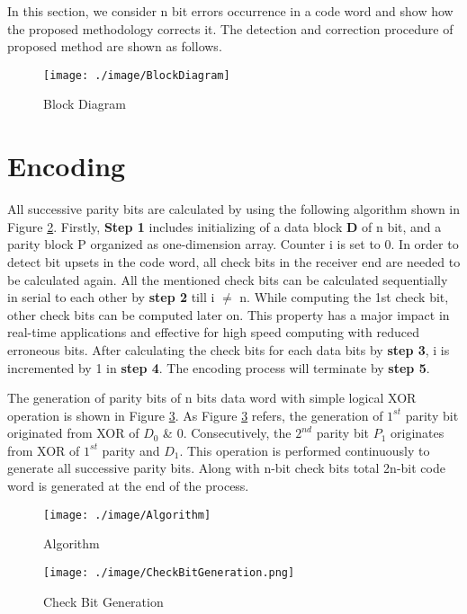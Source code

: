 \documentclass[12pt,a4paper]{report}
\begin{document}
In this section, we consider n bit errors occurrence in a code word and show how the proposed methodology corrects it. The detection and correction procedure of proposed method are shown as follows.\\
 
 \begin{figure}
  \texttt{[image: ./image/BlockDiagram]}
  \caption{Block Diagram}
  \label{fig:MethodologyOverview}
 \end{figure}
 
 \section{Encoding}
All successive
parity bits are calculated by using the following algorithm shown in Figure \ref{fig:Algorithm}. Firstly, \textbf{Step 1} includes initializing of a data block \textbf{D} of n bit, and a parity block P organized as one-dimension array. Counter i is set to 0. In order to detect bit upsets in the code word, all check bits in the receiver end are needed to be calculated again. All the mentioned check bits can be calculated sequentially in serial to each other by \textbf{step 2} till i $\neq$ n. While computing the 1st check bit, other check bits can be computed later on. This property has a major impact in real-time applications and effective for high speed computing with reduced erroneous bits. After calculating the check bits for each data bits by \textbf{step 3}, i is incremented by 1 in \textbf{step 4}. The encoding process will terminate by \textbf{step 5}. 

The generation of parity bits of n bits data word with simple logical XOR operation is shown in Figure \ref{fig:SPG}. As Figure \ref{fig:SPG} refers, the generation of $1^{st}$ parity bit originated from XOR of $D_0$ \& 0. Consecutively, the $2^{nd}$ parity bit $P_1$ originates from XOR of $1^{st}$ parity and $D_1$. This operation is performed continuously to generate all successive parity bits. Along with n-bit check bits total 2n-bit code word is generated at the end of the process.
 
\begin{figure}
 \texttt{[image: ./image/Algorithm]}
 \caption{Algorithm}
 \label{fig:Algorithm}
\end{figure}
 
 \begin{figure}
 \centering
 \texttt{[image: ./image/CheckBitGeneration.png]}
 \caption{Check Bit Generation}
 \label{fig:SPG}
 \end{figure}
 
\end{document}
